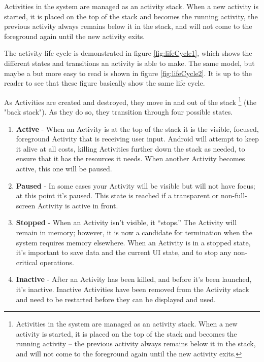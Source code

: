 Activities in the system are managed as an activity stack. When a new activity is started, it is placed on the top of the stack and becomes the running activity, the previous activity always remains below it in the stack, and will not come to the foreground again until the new activity exits.

The activity life cycle is demonstrated in figure \ref{fig:lifeCycle1}, which shows the different states and transitions an activity is able to make. The same model, but maybe a but more easy to read is shown in figure \ref{fig:lifeCycle2}. It is up to the reader to see that these figure basically show the same life cycle. 

As Activities are created and destroyed, they move in and out of the stack \footnote{Activities in the system are managed as an activity stack. When a new activity is started, it is placed on the top of the stack and becomes the running activity -- the previous activity always remains below it in the stack, and will not come to the foreground again until the new activity exits.} (the "back stack"). As they do so, they transition through four possible states.

\begin{enumerate}
	\item \textbf{Active} - When an Activity is at the top of the stack it is the visible, focused, foreground Activity that is receiving user input. Android will attempt to keep it alive at all costs, killing Activities further down the stack as needed, to ensure that it has the resources it needs. When another Activity becomes active, this one will be paused.
	\item \textbf{Paused} - In some cases your Activity will be visible but will not have focus; at this point it’s paused. This state is reached if a transparent or non-full-screen Activity is active in front.
	\item \textbf{Stopped} - When an Activity isn’t visible, it “stops.” The Activity will remain in memory; however, it is now a candidate for termination when the system requires memory elsewhere. When an Activity is in a stopped state, it’s important to save data and the current UI state, and to stop any non-critical operations.
	\item \textbf{Inactive} - After an Activity has been killed, and before it’s been launched, it’s inactive. Inactive Activities have been removed from the Activity stack and need to be restarted before they can be displayed and used.
\end{enumerate}

